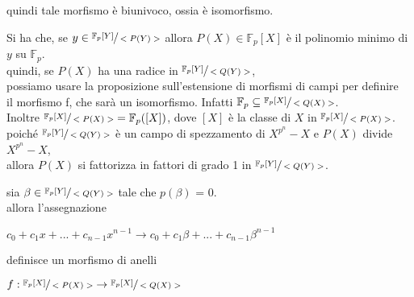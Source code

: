 \documentclass[a4paper,12pt]{article}
\theoremstyle{def}
\theoremstyle{prop}
\theoremstyle{esempio}
\theoremstyle{dimostrazione}
\theoremstyle{teo}
\theoremstyle{osservazione}
\begin{document}
quindi tale morfismo è biunivoco, ossia è isomorfismo.

\vspace{\baselineskip}

Si ha che, se \(y \in \sfrac{\mathbb{F}_p[Y]}{<P(Y)>}\) allora \(P(X) \in \mathbb{F}_p[X]\) è il polinomio minimo di \(y\) su \(\mathbb{F}_p\).\\
quindi, se \(P(X)\) ha una radice in \(\sfrac{\mathbb{F}_p[Y]}{<Q(Y)>}\),\\
possiamo usare la proposizione sull'estensione di morfismi di campi per definire\\
il morfismo f, che sarà un isomorfismo. Infatti \(\mathbb{F}_p \subseteq \sfrac{\mathbb{F}_p[X]}{<Q(X)>}\). \\
Inoltre \(\sfrac{\mathbb{F}_p[X]}{<P(X)>} = \mathbb{F}_p([X])\), dove \([X]\) è la classe di \(X\) in \(\sfrac{\mathbb{F}_p[X]}{<P(X)>}\).\\
poiché \(\sfrac{\mathbb{F}_p[Y]}{<Q(Y)>}\) è un campo di spezzamento di \(X^{p^n} - X\) e \(P(X)\) divide \(X^{p^n} - X\),\\
allora \(P(X)\) si fattorizza in fattori di grado 1 in \(\sfrac{\mathbb{F}_p[Y]}{<Q(Y)>}\).

\vspace{\baselineskip}

sia \(\beta \in \sfrac{\mathbb{F}_p[Y]}{<Q(Y)>}\) tale che \(p(\beta)\) = 0.\\
allora l'assegnazione
\begin{center}
    \(c_0 + c_1 x + ... + c_{n-1} x^{n-1} \rightarrow c_0 + c_1 \beta + ... + c_{n-1} \beta^{n-1}\)
\end{center}
definisce un morfismo di anelli
\begin{center}
    \(f: \sfrac{\mathbb{F}_p[X]}{<P(X)>} \rightarrow \sfrac{\mathbb{F}_p[X]}{<Q(X)>}\)
\end{center}

\newpage
\end{document}
